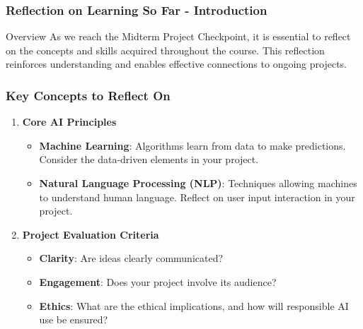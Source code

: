 \documentclass[aspectratio=169]{beamer}
\begin{document}
\begin{frame}[fragile]
    \frametitle{Reflection on Learning So Far - Introduction}
    \begin{block}{Overview}
        As we reach the Midterm Project Checkpoint, it is essential to reflect on the concepts and skills acquired throughout the course. This reflection reinforces understanding and enables effective connections to ongoing projects.
    \end{block}
\end{frame}

\begin{frame}[fragile]
    \frametitle{Key Concepts to Reflect On}
    \begin{enumerate}
        \item \textbf{Core AI Principles}
            \begin{itemize}
                \item \textbf{Machine Learning}: Algorithms learn from data to make predictions. Consider the data-driven elements in your project.
                \item \textbf{Natural Language Processing (NLP)}: Techniques allowing machines to understand human language. Reflect on user input interaction in your project.
            \end{itemize}
        \item \textbf{Project Evaluation Criteria}
            \begin{itemize}
                \item \textbf{Clarity}: Are ideas clearly communicated?
                \item \textbf{Engagement}: Does your project involve its audience?
                \item \textbf{Ethics}: What are the ethical implications, and how will responsible AI use be ensured?
            \end{itemize}
    \end{enumerate}
\end{frame}
\end{document}
